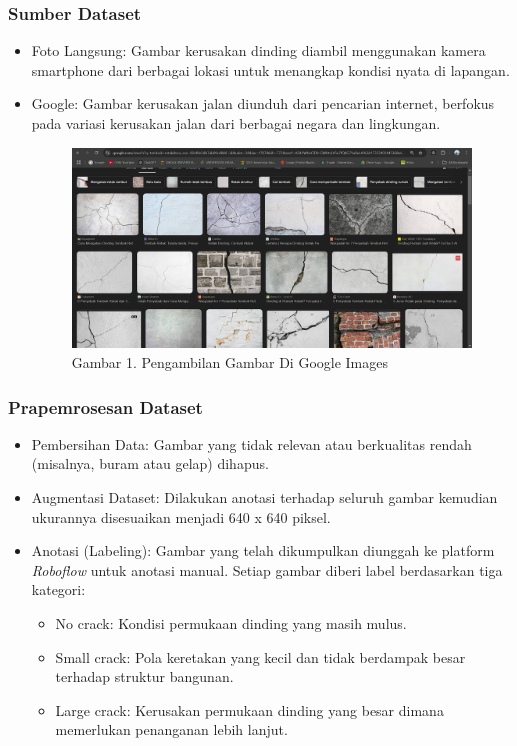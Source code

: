 \documentclass[12pt,a4paper]{article}
\begin{document}
\subsubsection{Sumber Dataset}
\begin{itemize}
    \item Foto Langsung: Gambar kerusakan dinding diambil menggunakan kamera smartphone dari berbagai lokasi untuk menangkap kondisi nyata di lapangan.
    \item Google: Gambar kerusakan jalan diunduh dari pencarian internet, berfokus pada variasi kerusakan jalan dari berbagai negara dan lingkungan.
    \begin{figure}[h]
        \centering
        \includegraphics[width=0.6\linewidth]{Images/google.png}
        \caption*{Gambar 1. Pengambilan Gambar Di Google Images}
        \label{fig:enter-label}
    \end{figure}
\end{itemize}

\subsubsection{Prapemrosesan Dataset}
\begin{itemize}
    \item Pembersihan Data: Gambar yang tidak relevan atau berkualitas rendah (misalnya, buram atau gelap) dihapus.
    \item Augmentasi Dataset: Dilakukan anotasi terhadap seluruh gambar kemudian ukurannya disesuaikan menjadi 640 x 640 piksel.
    \item Anotasi (Labeling): Gambar yang telah dikumpulkan diunggah ke platform \textit{Roboflow} untuk anotasi manual. Setiap gambar diberi label berdasarkan tiga kategori: 
    \begin{itemize}
        \item No crack: Kondisi permukaan dinding yang masih mulus.
        \item Small crack: Pola keretakan yang kecil dan tidak berdampak besar terhadap struktur bangunan.
        \item Large crack: Kerusakan permukaan dinding yang besar dimana memerlukan penanganan lebih lanjut.      
    \end{itemize}
\end{itemize}
\end{document}

